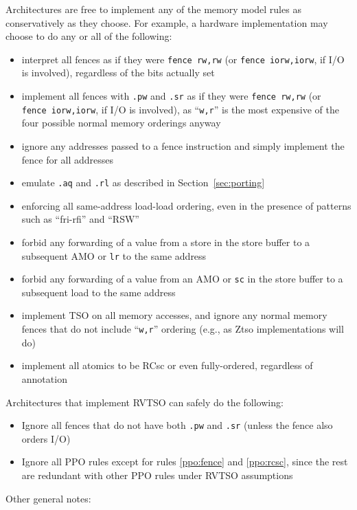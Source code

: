 Architectures are free to implement any of the memory model rules as conservatively as they choose.  For example, a hardware implementation may choose to do any or all of the following:
  \begin{itemize}
    \item interpret all fences as if they were {\tt fence rw,rw} (or {\tt fence iorw,iorw}, if I/O is involved), regardless of the bits actually set
    \item implement all fences with {\tt .pw} and {\tt .sr} as if they were {\tt fence~rw,rw} (or {\tt fence~iorw,iorw}, if I/O is involved), as ``{\tt w,r}'' is the most expensive of the four possible normal memory orderings anyway
    \item ignore any addresses passed to a fence instruction and simply implement the fence for all addresses
    \item emulate {\tt .aq} and {\tt .rl} as described in Section~\ref{sec:porting}
    \item enforcing all same-address load-load ordering, even in the presence of patterns such as ``fri-rfi'' and ``RSW''
    \item forbid any forwarding of a value from a store in the store buffer to a subsequent AMO or {\tt lr} to the same address
    \item forbid any forwarding of a value from an AMO or {\tt sc} in the store buffer to a subsequent load to the same address
    \item implement TSO on all memory accesses, and ignore any normal memory fences that do not include ``{\tt w,r}'' ordering (e.g., as Ztso implementations will do)
    \item implement all atomics to be RCsc or even fully-ordered, regardless of annotation
  \end{itemize}

Architectures that implement RVTSO can safely do the following:
\begin{itemize}
  \item Ignore all fences that do not have both {\tt .pw} and {\tt .sr} (unless the fence also orders I/O)
  \item Ignore all PPO rules except for rules \ref{ppo:fence} and \ref{ppo:rcsc}, since the rest are redundant with other PPO rules under RVTSO assumptions
\end{itemize}

Other general notes:

